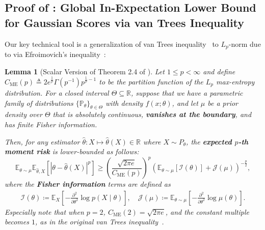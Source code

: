 \documentclass{article}
\def\gI{{\mathcal{I}}}
\def\gJ{{\mathcal{J}}}
\def\sP{{\mathbb{P}}}
\def\sR{{\mathbb{R}}}
\newcommand{\E}{\mathbb{E}}
\theoremstyle{plain}
\newtheorem{lemma}[theorem]{Lemma}
\theoremstyle{definition}
\theoremstyle{plain}
\newcommand{\bigabs}[1]{\left\lvert #1 \right\rvert}
\begin{document}
\subsection{\texorpdfstring{Proof of : Global In-Expectation Lower Bound for Gaussian Scores via van Trees Inequality}{Proof of Theorem F.8: Global In-Expectation Lower Bound for Gaussian Scores via van Trees Inequality}}
\label{app:van-trees}
Our key technical tool is a generalization of van Trees inequality~\citep{vanTrees,gill-levit} to $L_p$-norm due to \citet{chen2024vantrees} via Efroimovich's inequality~\citep{efroimovich1979}:
\begin{lemma}[Scalar Version of Theorem 2.4 of \citet{chen2024vantrees}]
\label{lem:van-trees}
    Let $1 \leq p < \infty$ and define $C_{\mathrm{ME}}(p) \triangleq 2 e^{\frac{1}{p}} \Gamma(p^{-1}) p^{\frac{1}{p} - 1}$ to be the partition function of the $L_p$ max-entropy distribution.
    For a closed interval $\Theta \subseteq \sR$, suppose that we have a parametric family of distributions $\{\sP_\theta\}_{\theta \in \Theta}$ with density $f(x; \theta)$, and let $\mu$ be a prior density over $\Theta$ that is absolutely continuous, \textbf{vanishes at the boundary}, and has finite Fisher information.
    
    Then, for any estimator $\hat{\theta} : X \mapsto \hat{\theta}(X) \in \sR$ where $X \sim P_\theta$, the \textbf{expected $p$-th moment risk} is lower-bounded as follows:
    \begin{equation}
        \E_{\theta \sim \mu}\E_{\hat{\theta}, X}\left[ \bigabs{\theta - \hat{\theta}(X)}^p \right] \geq \left( \frac{\sqrt{2 \pi e}}{C_{\mathrm{ME}}(p)} \right)^p \left( \E_{\theta \sim \mu}[\gI(\theta)] + \gJ(\mu) \right)^{-\frac{p}{2}},
    \end{equation}
    where the \textbf{Fisher information} terms are defined as
    \begin{align}
        \gI(\theta) \coloneq \E_X\left[ -\frac{\partial^2}{\partial \theta^2} \log p(X \mid \theta) \right], \quad \gJ(\mu) \coloneq \E_{\theta \sim \mu} \left[ -\frac{\partial^2}{\partial \theta^2} \log \mu(\theta) \right].
    \end{align}
    Especially note that when $p = 2$, $C_{\mathrm{ME}}(2) = \sqrt{2 \pi e}$, and the constant multiple becomes $1$, as in the original van Trees inequality~\citep{gill-levit,vanTrees}.
\end{lemma}
\end{document}
